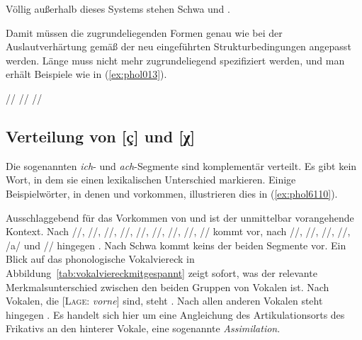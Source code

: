 
Völlig außerhalb dieses Systems stehen Schwa und \textipa{[5]}.


Damit müssen die zugrundeliegenden Formen genau wie bei der Auslautverhärtung gemäß der neu eingeführten Strukturbedingungen angepasst werden.
Länge muss nicht mehr zugrundeliegend spezifiziert werden, und man erhält Beispiele wie in (\ref{ex:phol013}).

\begin{exe}
  \ex\label{ex:phol013} \begin{xlist}
  	\ex // \phopro \textipa{[ve:g]}
  	\ex // \phopro \textipa{[h\o:l@]} 
  	\ex // \phopro \textipa{[Po:f@n]}
  \end{xlist}
\end{exe}

\subsection{Verteilung von [ç] und [χ]}

\label{sec:verteilungvonichach}

Die sogenannten \textit{ich}- und \textit{ach}-Segmente sind komplementär verteilt.
Es gibt kein Wort, in dem sie einen lexikalischen Unterschied markieren.
Einige Beispielwörter, in denen \textipa{[\c{c}]} und \textipa{[X]} vorkommen, illustrieren dies in (\ref{ex:phol6110}).

\begin{exe}
  \ex\label{ex:phol6110}
  \begin{xlist}
  \end{xlist}
\end{exe}

Ausschlaggebend für das Vorkommen von \textipa{[\c{c}]} und \textipa{[X]} ist der unmittelbar vorangehende Kontext.
Nach //, //, //, //, //, //, //, /\textipa{\o}/, /\textipa{\oe}/ kommt \textipa{[\c{c}]} vor, nach //, //, //, //, /a/ und // hingegen \textipa{[X]}.
Nach Schwa kommt keins der beiden Segmente vor.
Ein Blick auf das phonologische Vokalviereck in Abbildung~\ref{tab:vokalviereckmitgespannt} zeigt sofort, was der relevante Merkmalsunterschied zwischen den beiden Gruppen von Vokalen ist.
Nach Vokalen, die [\textsc{Lage}: \textit{vorne}] sind, steht \textipa{[\c{c}]}.
Nach allen anderen Vokalen steht hingegen \textipa{[X]}.
Es handelt sich hier um eine Angleichung des Artikulationsorts des Frikativs an den hinterer Vokale, eine sogenannte \textit{Assimilation}.

